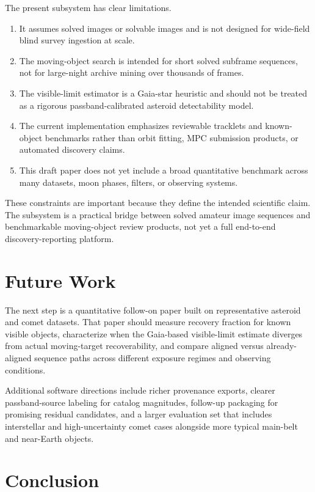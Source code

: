 \documentclass[modern]{aastex701}
\begin{document}
The present subsystem has clear limitations.

\begin{enumerate}
\item It assumes solved images or solvable images and is not designed for wide-field blind survey ingestion at scale.
\item The moving-object search is intended for short solved subframe sequences, not for large-night archive mining over thousands of frames.
\item The visible-limit estimator is a Gaia-star heuristic and should not be treated as a rigorous passband-calibrated asteroid detectability model.
\item The current implementation emphasizes reviewable tracklets and known-object benchmarks rather than orbit fitting, MPC submission products, or automated discovery claims.
\item This draft paper does not yet include a broad quantitative benchmark across many datasets, moon phases, filters, or observing systems.
\end{enumerate}

These constraints are important because they define the intended scientific claim. The subsystem is a practical bridge between solved amateur image sequences and benchmarkable moving-object review products, not yet a full end-to-end discovery-reporting platform.

\section{Future Work}\label{sec:future}

The next step is a quantitative follow-on paper built on representative asteroid and comet datasets. That paper should measure recovery fraction for known visible objects, characterize when the Gaia-based visible-limit estimate diverges from actual moving-target recoverability, and compare aligned versus already-aligned sequence paths across different exposure regimes and observing conditions.

Additional software directions include richer provenance exports, clearer passband-source labeling for catalog magnitudes, follow-up packaging for promising residual candidates, and a larger evaluation set that includes interstellar and high-uncertainty comet cases alongside more typical main-belt and near-Earth objects.

\section{Conclusion}\label{sec:conclusion}
\end{document}
